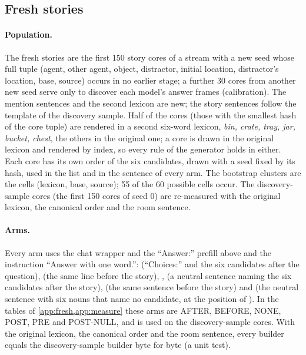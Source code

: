 \subsection{Fresh stories}\label{app:prompts-fresh}

\paragraph{Population.} The fresh stories are the first 150 story cores of a stream with a new seed whose full tuple (agent, other agent, object, distractor, initial location, distractor's location, base, source) occurs in no earlier stage; a further 30 cores from another new seed serve only to discover each model's answer frames (calibration). The mention sentences and the second lexicon are new; the story sentences follow the template of the discovery sample. Half of the cores (those with the smallest hash of the core tuple) are rendered in a second six-word lexicon, \emph{bin, crate, tray, jar, bucket, chest}, the others in the original one; a core is drawn in the original lexicon and rendered by index, so every rule of the generator holds in either. Each core has its own order of the six candidates, drawn with a seed fixed by its hash, used in the list and in the sentence of every arm. The bootstrap clusters are the cells (lexicon, base, source); 55 of the 60 possible cells occur. The discovery-sample cores (the first 150 cores of seed 0) are re-measured with the original lexicon, the canonical order and the room sentence. %

\paragraph{Arms.} Every arm uses the chat wrapper and the ``Answer:'' prefill above and the instruction ``Answer with one word.'': \fmtListA{} (``Choices:'' and the six candidates after the question), \fmtBefore{} (the same line before the story), \fmtNone{}, \fmtPost{} (a neutral sentence naming the six candidates after the story), \fmtSentB{} (the same sentence before the story) and \fmtNull{} (the neutral sentence with six nouns that name no candidate, at the position of \fmtPost{}). In the tables of \cref{app:fresh,app:measure} these arms are AFTER, BEFORE, NONE, POST, PRE and POST-NULL, and \fmtOpt{} is used on the discovery-sample cores. With the original lexicon, the canonical order and the room sentence, every builder equals the discovery-sample builder byte for byte (a unit test).

